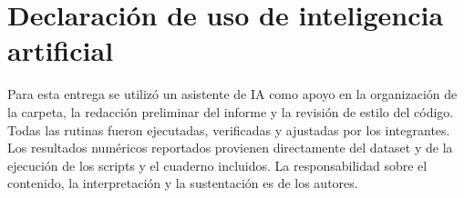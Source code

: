\documentclass[11pt,a4paper]{article}
\begin{document}
\section{Declaración de uso de inteligencia artificial}
Para esta entrega se utilizó un asistente de IA como apoyo en la organización de la carpeta, la redacción preliminar del informe y la revisión de estilo del código. Todas las rutinas fueron ejecutadas, verificadas y ajustadas por los integrantes. Los resultados numéricos reportados provienen directamente del dataset y de la ejecución de los scripts y el cuaderno incluidos. La responsabilidad sobre el contenido, la interpretación y la sustentación es de los autores.
\end{document}
